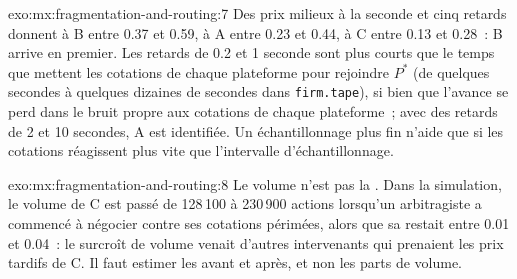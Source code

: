 \begin{solution}{exo:mx:fragmentation-and-routing:7}
Des prix milieux à la seconde et cinq retards donnent à B entre 0.37 et 0.59, à A entre 0.23 et 0.44, à C entre 0.13 et 0.28~: B arrive en premier. Les retards de 0.2 et 1 seconde sont plus courts que le
temps que mettent les cotations de chaque plateforme pour rejoindre $P^\ast$ (de quelques secondes à quelques dizaines de secondes dans \texttt{firm.tape}), si bien que l'avance se perd dans le bruit propre
aux cotations de chaque plateforme~; avec des retards de 2 et 10 secondes, A est identifiée. Un échantillonnage plus fin n'aide que si les cotations réagissent plus vite que l'intervalle d'échantillonnage.
\end{solution}

\begin{solution}{exo:mx:fragmentation-and-routing:8}
Le volume n'est pas la . Dans la simulation, le volume de C est passé de 128\,100 à 230\,900 actions lorsqu'un arbitragiste a commencé à négocier contre ses cotations
périmées, alors que sa  restait entre 0.01 et 0.04~: le surcroît de volume venait d'autres intervenants qui prenaient les prix tardifs de C. Il faut estimer les  avant et après, et non les parts de volume.
\end{solution}

